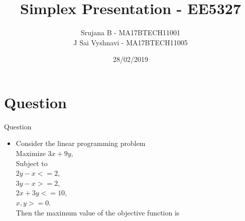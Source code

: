 \documentclass{beamer}
\title[Your Short Title]{Simplex Presentation - EE5327}
\author{Srujana B - MA17BTECH11001\\J Sai Vyshnavi - MA17BTECH11005}
\date{28/02/2019}
\begin{document}
\begin{frame}
  \titlepage
\end{frame}


\section{Question}

\begin{frame}{Question}

\begin{itemize}
  \item Consider the linear programming problem\\
  Maximize $3x + 9y$,\\
  Subject to\\
        \hspace{2 cm}$2y-x<=2$,\\
        \hspace{2 cm}$3y-x>=2$,\\
        \hspace{2 cm}$2x+3y<=10$,\\
        \hspace{2 cm}$x,y>=0$.\\
Then the maximum value of the objective function is 
\end{itemize}

\vskip 1cm

\end{frame}
\end{document}
